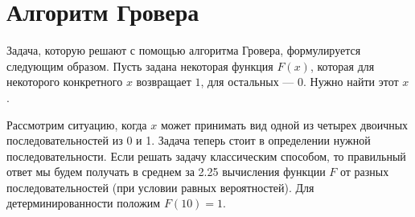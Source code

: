\documentclass[a4paper, 12pt]{article}
\renewcommand{\mod}{\text{\! mod \!}} %
\begin{document}
%
%
%
%
%
%
%
%
%
%
%
%

\section{Алгоритм Гровера}

Задача, которую решают с помощью алгоритма Гровера, формулируется следующим образом. Пусть задана некоторая функция $F(x)$, которая для некоторого конкретного $x$ возвращает $1$, для остальных --- $0$. Нужно найти этот $x$. 

Рассмотрим ситуацию, когда $x$ может принимать вид одной из четырех двоичных последовательностей из 0 и 1. Задача теперь стоит в определении нужной последовательности. Если решать задачу классическим способом, то правильный ответ мы будем получать в среднем за 2.25 вычисления функции $F$ от разных последовательностей (при условии равных вероятностей). Для детерминированности положим $F(10) = 1$.
\end{document}
